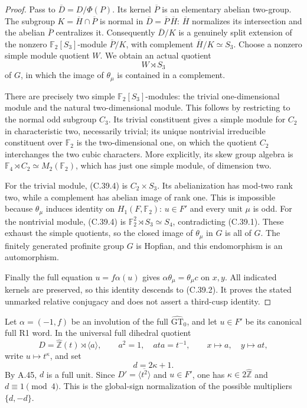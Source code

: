 \begin{proof}
Pass to \(\overline D=D/\Phi(P)\).
Its kernel \(\overline P\) is an elementary abelian
two-group. The subgroup
\(K=\overline H\cap\overline P\) is normal in
\(\overline D=\overline P\,\overline H\):
\(\overline H\) normalizes its intersection and the
abelian \(\overline P\) centralizes it.
Consequently \(\overline D/K\) is a genuinely split
extension of the nonzero \(\mathbb F_2[S_3]\)-module
\(\overline P/K\), with complement
\(\overline H/K\simeq S_3\). Choose a nonzero simple
module quotient \(W\). We obtain an actual quotient
\[
                                  W\rtimes S_3
 \tag{C.39.4}
\]
of \(G\), in which the image of \(\theta_\mu\) is
contained in a complement.

There are precisely two simple
\(\mathbb F_2[S_3]\)-modules: the trivial one-dimensional
module and the natural two-dimensional module. This
follows by restricting to the normal odd subgroup \(C_3\).
Its trivial constituent gives a simple module for \(C_2\)
in characteristic two, necessarily trivial; its unique
nontrivial irreducible constituent over \(\mathbb F_2\)
is the two-dimensional one, on which the quotient \(C_2\)
interchanges the two cubic characters. More explicitly, its
skew group algebra is
\(\mathbb F_4\rtimes C_2\simeq M_2(\mathbb F_2)\),
which has just one simple module, of dimension two.

For the trivial module, (C.39.4) is \(C_2\times S_3\).
Its abelianization has mod-two rank two, while a complement
has abelian image of rank one. This is impossible because
\(\theta_\mu\) induces identity on \(H_1(F,\mathbb F_2)\):
\(u\in F'\) and every unit \(\mu\) is odd.
For the nontrivial module, (C.39.4) is
\(\mathbb F_2^2\rtimes S_3\simeq S_4\), contradicting
(C.39.1). These exhaust the simple quotients, so the
closed image of \(\theta_\mu\) in \(G\) is all of \(G\).
The finitely generated profinite group \(G\) is Hopfian,
and this endomorphism is an automorphism.

Finally the full equation \(u=f\alpha(u)\) gives
\(\alpha\theta_\mu=\theta_\mu c\) on \(x,y\).
All indicated kernels are preserved, so this identity
descends to (C.39.2). It proves the stated unmarked
relative conjugacy and does not assert a third-cusp identity.
\end{proof}


Let \(\alpha=(-1,f)\) be an involution of the full
\(\widehat{\mathrm{GT}}_0\), and let \(u\in F'\) be its
canonical full R1 word. In the universal full dihedral quotient
\[
 D=\widehat{\mathbb Z}(t)\rtimes\langle a\rangle,\qquad
 a^2=1,\quad ata=t^{-1},\qquad x\longmapsto a,\quad y\longmapsto at,
\]
write \(u\longmapsto t^\kappa\), and set
\[
                         d=2\kappa+1.
 \tag{C.40.1}
\]
By A.45, \(d\) is a full unit. Since \(D'=\overline{\langle
t^2\rangle}\) and \(u\in F'\), one has \(\kappa\in2\widehat{\mathbb Z}\)
and \(d\equiv1\pmod4\). This is the global-sign normalization
of the possible multipliers \(\{d,-d\}\).


